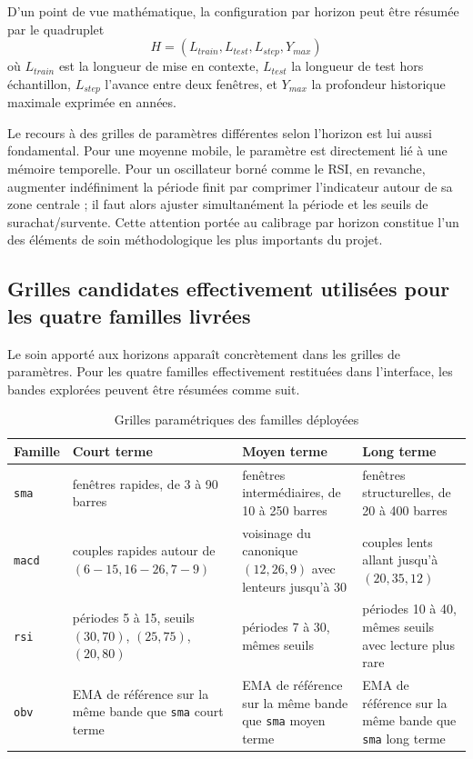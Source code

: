 D'un point de vue mathématique, la configuration par horizon peut être résumée
par le quadruplet
\[
H = (L_{train},L_{test},L_{step},Y_{max})
\]
où \(L_{train}\) est la longueur de mise en contexte, \(L_{test}\) la longueur
de test hors échantillon, \(L_{step}\) l'avance entre deux fenêtres, et
\(Y_{max}\) la profondeur historique maximale exprimée en années.

Le recours à des grilles de paramètres différentes selon l'horizon est lui aussi
fondamental. Pour une moyenne mobile, le paramètre est directement lié à une
mémoire temporelle. Pour un oscillateur borné comme le RSI, en revanche,
augmenter indéfiniment la période finit par comprimer l'indicateur autour de sa
zone centrale ; il faut alors ajuster simultanément la période et les seuils de
surachat/survente. Cette attention portée au calibrage par horizon constitue
l'un des éléments de soin méthodologique les plus importants du projet.

\subsection{Grilles candidates effectivement utilisées pour les quatre familles livrées}
Le soin apporté aux horizons apparaît concrètement dans les grilles de
paramètres. Pour les quatre familles effectivement restituées dans l'interface,
les bandes explorées peuvent être résumées comme suit.

\begin{table}[H]
\centering
\caption{Grilles paramétriques des familles déployées}
\label{tab:implemented-grids}
\begin{tabular}{p{2cm}p{3.2cm}p{3.3cm}p{3.3cm}}
\toprule
\textbf{Famille} & \textbf{Court terme} & \textbf{Moyen terme} & \textbf{Long terme} \\
\midrule
\texttt{sma} & fenêtres rapides, de 3 à 90 barres & fenêtres intermédiaires, de 10 à 250 barres & fenêtres structurelles, de 20 à 400 barres \\
\texttt{macd} & couples rapides autour de \((6\!-\!15,16\!-\!26,7\!-\!9)\) & voisinage du canonique \((12,26,9)\) avec lenteurs jusqu'à 30 & couples lents allant jusqu'à \((20,35,12)\) \\
\texttt{rsi} & périodes 5 à 15, seuils \((30,70)\), \((25,75)\), \((20,80)\) & périodes 7 à 30, mêmes seuils & périodes 10 à 40, mêmes seuils avec lecture plus rare \\
\texttt{obv} & EMA de référence sur la même bande que \texttt{sma} court terme & EMA de référence sur la même bande que \texttt{sma} moyen terme & EMA de référence sur la même bande que \texttt{sma} long terme \\
\bottomrule
\end{tabular}
\end{table}

